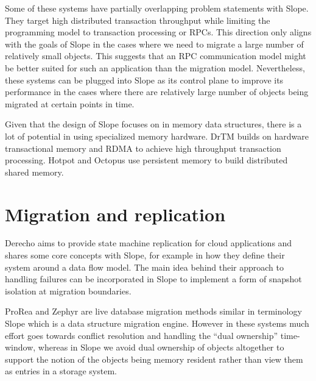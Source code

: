 Some of these systems have partially overlapping problem statements with
Slope. They target high distributed transaction throughput while limiting
the programming model to transaction processing or RPCs.
This direction only aligns with the goals of Slope in the cases where we
need to migrate a large number of relatively small objects. This suggests
that an RPC communication model might be better suited for such an
application than the migration model. Nevertheless, these systems
can be plugged into Slope as its control plane to improve its performance
in the cases where there are relatively large number of objects being
migrated at certain points in time.

Given that the design of Slope focuses on in memory data structures, there
is a lot of potential in using specialized memory hardware. DrTM
\cite{drtm2017} builds on hardware transactional memory and RDMA
to achieve high throughput transaction processing.
Hotpot \cite{Shan2017distributed} and Octopus \cite{Lu2017rdmadistributed}
use persistent memory to build distributed shared memory.


\section{Migration and replication}
Derecho \cite{jha2019derecho} aims to provide state machine replication
for cloud applications and shares some core concepts with Slope, for
    example in how they define their system around a data flow model.
    The main idea behind their approach to handling failures can be
    incorporated in Slope to implement a form of snapshot isolation at
    migration boundaries.

ProRea \cite{ProRea2013} and Zephyr \cite{zephyr2011elmore} are live
database migration methods similar in terminology Slope which is a
data structure migration engine. However in these systems much effort goes
towards conflict resolution and handling the ``dual ownership''
time-window, whereas in Slope we avoid dual ownership of objects
altogether to support the notion of the objects being memory resident
rather than view them as entries in a storage system.
